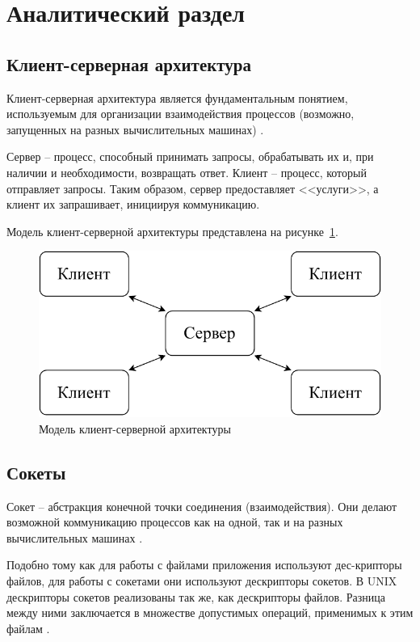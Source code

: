 \section{Аналитический раздел}

\subsection{Клиент-серверная архитектура}

Клиент-серверная архитектура является фундаментальным понятием, используемым для организации взаимодействия процессов (возможно, запущенных на разных вычислительных машинах) \cite{Tiwari2012ASP}.

Сервер -- процесс, способный принимать запросы, обрабатывать их и, при наличии и необходимости, возвращать ответ. Клиент -- процесс, который отправляет запросы. Таким образом, сервер предоставляет <<услуги>>, а клиент их запрашивает, инициируя коммуникацию.

Модель клиент-серверной архитектуры представлена на рисунке~\ref{client-server}.

\begin{figure}[ht]
	\centering
	\includegraphics[scale=0.8]{img/client-server.pdf}
	\caption{Модель клиент-серверной архитектуры}
	\label{client-server}
\end{figure}

\subsection{Сокеты}

Сокет -- абстракция конечной точки соединения (взаимодействия). Они делают возможной коммуникацию процессов как на одной, так и на разных вычислительных машинах \cite{stevens}.

Подобно тому как для работы с файлами приложения используют дес-крипторы файлов, для работы с сокетами они используют дескрипторы сокетов. В UNIX дескрипторы сокетов реализованы так же, как дескрипторы файлов. Разница между ними заключается в множестве допустимых операций, применимых к этим файлам \cite{stevens}.

